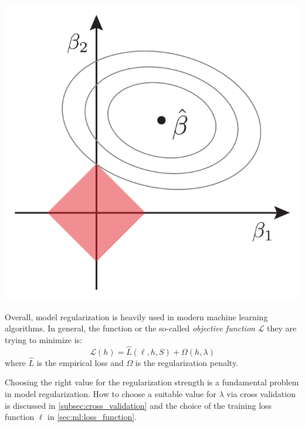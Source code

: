 \begin{marginfigure}[0.5cm]
  \includegraphics[width=1\textwidth]{figures/ridge_lasso_sparse/lasso.pdf}
  \caption[Regularization Effect of $L_1$]
    {Sketch of the similar minimization problem defined in Figure~\ref{fig:ml:regularization_effect_ridge} for the $L_1$-penalty. The \textcolor{red}{constrain region} shown in red is defined as $\abs{\beta_1} + \abs{\beta_2} \leq t$ for $L_1$ in $2D$-space and the contours of the unconstrained solution is shown with grey lines. Adapted from \autocite{hastieElementsStatisticalLearning2009}.
    }
  \label{fig:ml:regularization_effect_lasso}
\end{marginfigure} 

Overall, model regularization is heavily used in modern machine learning algorithms. In general, the function or the so-called \emph{objective function} $\mathcal{L}$ they are trying to minimize is:
\begin{equation}
  \mathcal{L}(h) = \hat{L}(\ell, h, S) + \Omega(h, \lambda)
\end{equation}
where $\hat{L}$ is the empirical loss and $\Omega$ is the regularization penalty. 

Choosing the right value for the regularization strength is a fundamental problem in model regularization. How to choose a suitable value for $\lambda$ via cross validation is discussed in \autoref{subsec:cross_validation} and the choice of the training loss function $\ell$ in \autoref{sec:ml:loss_function}. 

